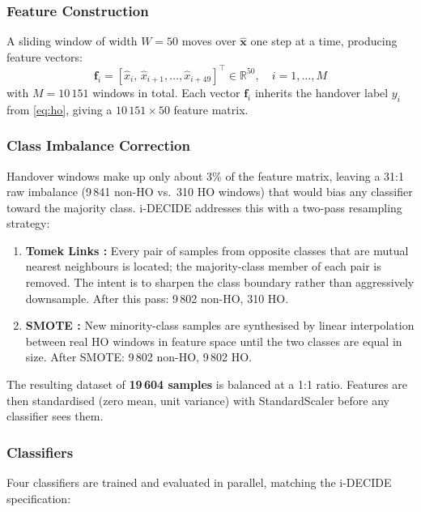 \documentclass[journal]{IEEEtran}
\begin{document}
\subsubsection{Feature Construction}

A sliding window of width $W=50$ moves over $\hat{\mathbf{x}}$ one
step at a time, producing feature vectors:
\begin{equation}
  \mathbf{f}_i = [\hat{x}_i,\,\hat{x}_{i+1},\ldots,\hat{x}_{i+49}]
  ^\top \in \mathbb{R}^{50},\quad i = 1,\ldots,M
  \label{eq:win}
\end{equation}
with $M = 10\,151$ windows in total. Each vector $\mathbf{f}_i$
inherits the handover label $y_i$ from \eqref{eq:ho}, giving a
$10\,151 \times 50$ feature matrix.

\subsubsection{Class Imbalance Correction}

Handover windows make up only about 3\% of the feature matrix,
leaving a 31:1 raw imbalance (9\,841 non-HO vs.\ 310 HO windows)
that would bias any classifier toward the majority class. i-DECIDE
addresses this with a two-pass resampling strategy:
\begin{enumerate}
  \item \textbf{Tomek Links \cite{tomek1976}:} Every pair of samples
  from opposite classes that are mutual nearest neighbours is located;
  the majority-class member of each pair is removed. The intent is to
  sharpen the class boundary rather than aggressively downsample.
  After this pass: 9\,802 non-HO, 310 HO.

  \item \textbf{SMOTE \cite{chawla2002}:} New minority-class samples
  are synthesised by linear interpolation between real HO windows
  in feature space until the two classes are equal in size.
  After SMOTE: 9\,802 non-HO, 9\,802 HO.
\end{enumerate}
The resulting dataset of \textbf{19\,604 samples} is balanced at a 1:1
ratio. Features are then standardised (zero mean, unit variance) with
StandardScaler before any classifier sees them.

\subsubsection{Classifiers}

Four classifiers are trained and evaluated in parallel, matching the
i-DECIDE specification:
\end{document}
